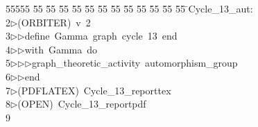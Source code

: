 %
%
\begin{tabbing}
55555 \= 55 \= 55 \= 55 \= 55 \= 55 \= 55 \= 55 \= 55 \= 55 \= 55 \= 55 \= 55 \= \>Cycle\_13\_aut:\\[0pt]
2\>$\triangleright$\>(ORBITER)\ v\ 2\ \\[0pt]
3\>$\triangleright$\>$\triangleright$\>define\ Gamma\ graph\ cycle\ 13\ end\ \\[0pt]
4\>$\triangleright$\>$\triangleright$\>with\ Gamma\ do\ \\[0pt]
5\>$\triangleright$\>$\triangleright$\>$\triangleright$\>graph\_theoretic\_activity\ automorphism\_group\ \\[0pt]
6\>$\triangleright$\>$\triangleright$\>end\\[0pt]
7\>$\triangleright$\>(PDFLATEX)\ Cycle\_13\_reporttex\\[0pt]
8\>$\triangleright$\>(OPEN)\ Cycle\_13\_reportpdf\\[0pt]
9\>\end{tabbing}
